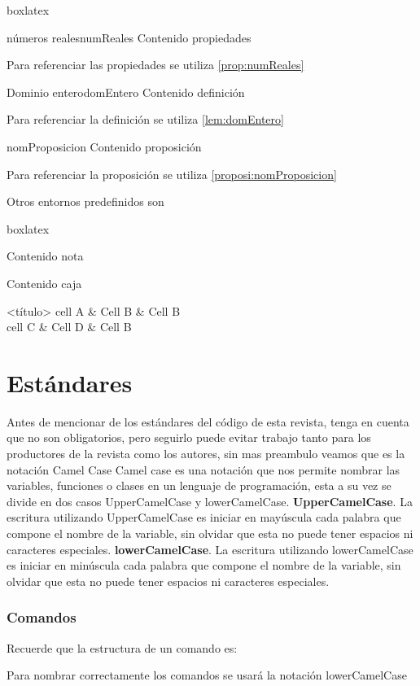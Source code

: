 {\begin{tcblisting}{boxlatex}
\begin{myprop}{números reales}{numReales}
			Contenido propiedades
		\end{myprop}
		Para referenciar las propiedades se utiliza \ref{prop:numReales}
		\begin{mydef}{Dominio entero}{domEntero}
			Contenido definición
		\end{mydef}
		Para referenciar la definición se utiliza \ref{lem:domEntero}
		\begin{myproposi}{}{nomProposicion}
			Contenido proposición
		\end{myproposi}
		Para referenciar la proposición se utiliza \ref{proposi:nomProposicion}
	\end{tcblisting}
	Otros entornos predefinidos son
	\begin{tcblisting}{boxlatex}
		\begin{mynote}
			Contenido nota
		\end{mynote}
		\begin{mybox}[<título>]
			Contenido caja
		\end{mybox}
		\begin{mytable}[tabularx={X|X|X}, width=10cm]{<título>}
			cell A & Cell B & Cell B\\\hline
			cell C & Cell D & Cell B
		\end{mytable}
	\end{tcblisting}
	\newpage
	\section{Estándares}\label{sec:estandares}
	Antes de mencionar de los estándares del código de esta revista, tenga en cuenta que no son obligatorios, pero seguirlo puede evitar trabajo tanto para los productores de la revista como los autores, sin mas preambulo veamos que es la notación Camel Case\pap 
	Camel case es una notación que nos permite nombrar las variables, funciones o clases en un lenguaje de programación, esta a su vez se divide en dos casos UpperCamelCase y lowerCamelCase.\pap
	\textbf{UpperCamelCase}.
	La escritura utilizando UpperCamelCase es iniciar en mayúscula cada palabra que compone el nombre de la variable, sin olvidar que esta no puede tener espacios ni caracteres especiales.\pap 
	\textbf{lowerCamelCase}.
	La escritura utilizando lowerCamelCase es iniciar en minúscula cada palabra que compone el nombre de la variable, sin olvidar que esta no puede tener espacios ni caracteres especiales.
	\subsubsection{Comandos}
	Recuerde que la estructura de un comando es:
	\begin{center}
		\begin{tcblisting}{boxlatex}
			\newcommand{\<nombre>}[<arguments number>]{<function>}
		\end{tcblisting}
	\end{center}
	Para nombrar correctamente los comandos se usará la notación lowerCamelCase
}
